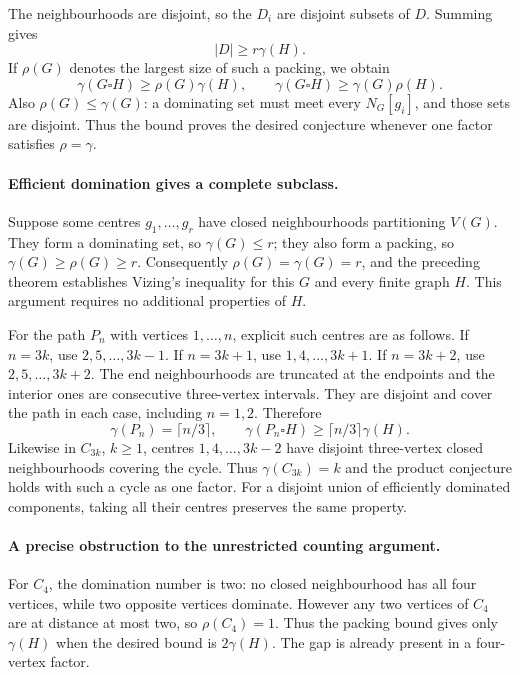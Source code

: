 \documentclass[11pt,a4paper]{article}
\begin{document}
The neighbourhoods are disjoint, so the $D_i$ are disjoint subsets
of $D$. Summing gives
\[
                     |D|\ge r\gamma(H).
\]
If $\rho(G)$ denotes the largest size of such a packing, we obtain
\[
              \gamma(G\square H)\ge\rho(G)\gamma(H),
              \qquad
              \gamma(G\square H)\ge\gamma(G)\rho(H).
\]
Also $\rho(G)\le\gamma(G)$: a dominating set must meet every
$N_G[g_i]$, and those sets are disjoint. Thus the bound proves the
desired conjecture whenever one factor satisfies $\rho=\gamma$.

\paragraph{Efficient domination gives a complete subclass.}
Suppose some centres $g_1,\ldots,g_r$ have closed neighbourhoods
partitioning $V(G)$. They form a dominating set, so $\gamma(G)\le r$;
they also form a packing, so $\gamma(G)\ge\rho(G)\ge r$.
Consequently $\rho(G)=\gamma(G)=r$, and the preceding theorem
establishes Vizing's inequality for this $G$ and every finite graph
$H$. This argument requires no additional properties of $H$.

For the path $P_n$ with vertices $1,\ldots,n$, explicit such centres
are as follows. If $n=3k$, use $2,5,\ldots,3k-1$. If $n=3k+1$,
use $1,4,\ldots,3k+1$. If $n=3k+2$, use $2,5,\ldots,3k+2$.
The end neighbourhoods are truncated at the endpoints and the interior
ones are consecutive three-vertex intervals. They are disjoint and
cover the path in each case, including $n=1,2$. Therefore
\[
                   \gamma(P_n)=\lceil n/3\rceil,
 \qquad \gamma(P_n\square H)\ge\lceil n/3\rceil\gamma(H).
\]
Likewise in $C_{3k}$, $k\ge1$, centres $1,4,\ldots,3k-2$
have disjoint three-vertex closed neighbourhoods covering the cycle.
Thus $\gamma(C_{3k})=k$ and the product conjecture holds with such
a cycle as one factor. For a disjoint union of efficiently dominated
components, taking all their centres preserves the same property.

\paragraph{A precise obstruction to the unrestricted counting argument.}
For $C_4$, the domination number is two: no closed neighbourhood has
all four vertices, while two opposite vertices dominate. However any
two vertices of $C_4$ are at distance at most two, so $\rho(C_4)=1$.
Thus the packing bound gives only $\gamma(H)$ when the desired bound
is $2\gamma(H)$. The gap is already present in a four-vertex factor.
\end{document}
